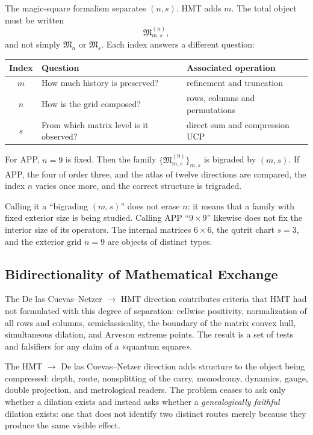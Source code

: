 The magic-square formalism separates $(n,s)$. HMT adds $m$. The
total object must be written
\[
 \mathfrak M^{(n)}_{m,s},
 \tag{GMC-1.5}
\]
and not simply \(\mathfrak M_n\) or \(\mathfrak M_s\). Each index answers
a different question:

\begin{center}
\begin{tabularx}{.92\textwidth}{@{}c L{.25\textwidth}Y@{}}
\toprule
Index & Question & Associated operation\\
\midrule
$m$ & How much history is preserved? & refinement and truncation\\
$n$ & How is the grid composed? & rows, columns and permutations\\
$s$ & From which matrix level is it observed? & direct sum and compression UCP\\
\bottomrule
\end{tabularx}
\end{center}

For APP, $n=9$ is fixed. Then the family
$\{\mathfrak M^{(9)}_{m,s}\}_{m,s}$ is bigraded by $(m,s)$. If
APP, the four \QLS of order three, and the atlas of twelve directions are
compared, the index $n$ varies once more, and the correct structure is trigraded.

\begin{controlbox}
Calling it a “bigrading $(m,s)$” does not erase $n$: it means
that a family with fixed exterior size is being studied. Calling APP
“$9\times9$” likewise does not fix the interior size of its operators.
The internal matrices $6\times6$, the qutrit chart $s=3$, and the
exterior grid $n=9$ are objects of distinct types.
\end{controlbox}

\subsection{Bidirectionality of Mathematical Exchange}

The De las Cuevas--Netzer $\longrightarrow$ HMT direction contributes criteria that HMT had not
formulated with this degree of separation: cellwise positivity,
normalization of all rows and columns, semiclassicality, the boundary of the
matrix convex hull, simultaneous dilation, and Arveson extreme points. The
result is a set of tests and falsifiers for any claim of a
«quantum square».

The HMT $\longrightarrow$ De las Cuevas--Netzer direction adds structure to the object
being compressed: depth, route, nonsplitting of the carry, monodromy, dynamics,
gauge, double projection, and metrological readers. The problem ceases to ask
only whether a dilation exists and instead asks whether a
\emph{genealogically faithful} dilation exists: one that does not identify two distinct routes merely
because they produce the same visible effect.

